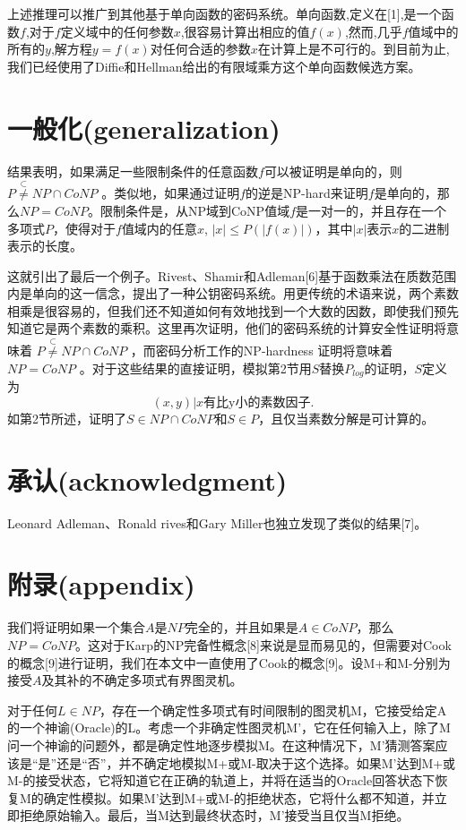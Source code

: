 \documentclass[]{article}
\begin{document}
	上述推理可以推广到其他基于单向函数的密码系统。单向函数,定义在[1],是一个函数$f$,对于$f$定义域中的任何参数$x$,很容易计算出相应的值$f (x)$,然而,几乎$f$值域中的所有的$y$,解方程$y = f(x)$对任何合适的参数$x$在计算上是不可行的。到目前为止,我们已经使用了Diffie和Hellman给出的有限域乘方这个单向函数候选方案。\par
	
	
	\section{一般化(generalization)}
	结果表明，如果满足一些限制条件的任意函数$f$可以被证明是单向的，则$P\overset{\subset}{\neq} NP \cap CoNP$ 。类似地，如果通过证明$f$的逆是NP-hard来证明$f$是单向的，那么$NP= CoNP$。限制条件是，从NP域到CoNP值域$f$是一对一的，并且存在一个多项式$P$，使得对于$f$值域内的任意$x$, $|x|\leq P(|f(x)|)$，其中$|x|$表示$x$的二进制表示的长度。\par
	
	
	这就引出了最后一个例子。Rivest、Shamir和Adleman[6]基于函数乘法在质数范围内是单向的这一信念，提出了一种公钥密码系统。用更传统的术语来说，两个素数相乘是很容易的，但我们还不知道如何有效地找到一个大数的因数，即使我们预先知道它是两个素数的乘积。这里再次证明，他们的密码系统的计算安全性证明将意味着 $P\overset{\subset}{\neq} NP \cap CoNP$ ，而密码分析工作的NP-hardness 证明将意味着$NP=CoNP$ 。对于这些结果的直接证明，模拟第2节用$S$替换$P_{log}$的证明，$S$定义为
	\[{(x,y)|x \text{有比y小的素数因子}}.\]
	如第2节所述，证明了$S\in NP\cap CoNP$和$S\in P$，且仅当素数分解是可计算的。
	
	\section*{承认(acknowledgment)}
	Leonard Adleman、Ronald rives和Gary Miller也独立发现了类似的结果[7]。
	
	\section*{附录(appendix)}
	我们将证明如果一个集合$A$是$NP$完全的，并且如果是$A\in CoNP$，那么$NP= CoNP$。这对于Karp的NP完备性概念[8]来说是显而易见的，但需要对Cook的概念[9]进行证明，我们在本文中一直使用了Cook的概念[9]。设M+和M-分别为接受$A$及其补的不确定多项式有界图灵机。\par
	
	对于任何$L\in NP$，存在一个确定性多项式有时间限制的图灵机M，它接受给定A的一个神谕(Oracle)的L。考虑一个非确定性图灵机M'，它在任何输入上，除了M问一个神谕的问题外，都是确定性地逐步模拟M。在这种情况下，M'猜测答案应该是“是”还是“否”，并不确定地模拟M+或M-取决于这个选择。如果M'达到M+或M-的接受状态，它将知道它在正确的轨道上，并将在适当的Oracle回答状态下恢复M的确定性模拟。如果M'达到M+或M-的拒绝状态，它将什么都不知道，并立即拒绝原始输入。最后，当M达到最终状态时，M'接受当且仅当M拒绝。\par
	
\end{document}
